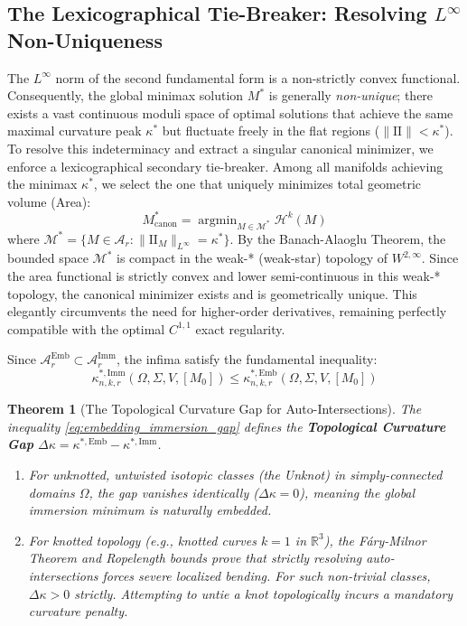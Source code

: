 \documentclass[11pt,reqno]{amsart}
\newtheorem{theorem}{Theorem}[section]
\theoremstyle{definition}
\providecommand{\R}{\mathbb{R}}
\providecommand{\II}{\mathrm{I\!I}}
\providecommand{\Hsn}{\mathcal{H}}
\numberwithin{equation}{section}
\DeclareMathOperator*{\argmin}{argmin}
\providecommand{\II}{\mathrm{II}}
\providecommand{\R}{\mathbb{R}}
\providecommand{\Hsn}{\mathcal{H}}
\begin{document}
\subsection{The Lexicographical Tie-Breaker: Resolving \texorpdfstring{$L^\infty$}{L\textasciicircum\textbackslash{}infty} Non-Uniqueness}
The $L^\infty$ norm of the second fundamental form is a non-strictly convex functional. Consequently, the global minimax solution $M^*$ is generally \emph{non-unique}; there exists a vast continuous moduli space of optimal solutions that achieve the same maximal curvature peak $\kappa^*$ but fluctuate freely in the flat regions ($\|\II\| < \kappa^*$). To resolve this indeterminacy and extract a singular canonical minimizer, we enforce a lexicographical secondary tie-breaker. Among all manifolds achieving the minimax $\kappa^*$, we select the one that uniquely minimizes total geometric volume (Area):
\begin{equation}
M^*_{\text{canon}} = \argmin_{M \in \mathcal{M}^*} \Hsn^k(M)
\end{equation}
where $\mathcal{M}^* = \{M \in \mathcal{A}_r : \|\II_M\|_{L^\infty} = \kappa^*\}$. By the Banach-Alaoglu Theorem, the bounded space $\mathcal{M}^*$ is compact in the weak-* (weak-star) topology of $W^{2,\infty}$. Since the area functional is strictly convex and lower semi-continuous in this weak-* topology, the canonical minimizer exists and is geometrically unique. This elegantly circumvents the need for higher-order derivatives, remaining perfectly compatible with the optimal $C^{1,1}$ exact regularity.

Since $\mathcal{A}_r^{\mathrm{Emb}} \subset \mathcal{A}_r^{\mathrm{Imm}}$, the infima satisfy the fundamental inequality:
\begin{equation}
\label{eq:embedding_immersion_gap}
\kappa^{*,\mathrm{Imm}}_{n,k,r}(\Omega, \Sigma, V, [M_0]) \le \kappa^{*,\mathrm{Emb}}_{n,k,r}(\Omega, \Sigma, V, [M_0])
\end{equation}

\begin{theorem}[The Topological Curvature Gap for Auto-Intersections]
The inequality \eqref{eq:embedding_immersion_gap} defines the \textbf{Topological Curvature Gap} $\Delta\kappa = \kappa^{*,\mathrm{Emb}} - \kappa^{*,\mathrm{Imm}}$. 
\begin{enumerate}
    \item For unknotted, untwisted isotopic classes (the Unknot) in simply-connected domains $\Omega$, the gap vanishes identically ($\Delta\kappa = 0$), meaning the global immersion minimum is naturally embedded.
    \item For knotted topology (e.g., knotted curves $k=1$ in $\R^3$), the F\'ary-Milnor Theorem and Ropelength bounds prove that strictly resolving auto-intersections forces severe localized bending. For such non-trivial classes, $\Delta\kappa > 0$ strictly. Attempting to untie a knot topologically incurs a mandatory curvature penalty.
\end{enumerate}
\end{theorem}
\end{document}
